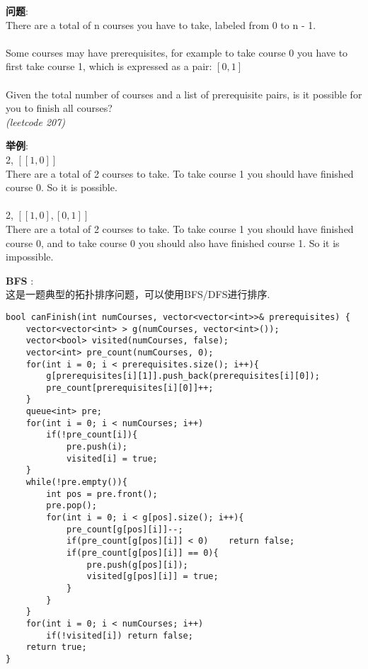     
\begin{description}
    \item{\textbf{问题}}:\\
There are a total of n courses you have to take, labeled from 0 to n - 1.\\
\\
Some courses may have prerequisites, for example to take course 0 you have to first take course 1, which is expressed as a pair: $[0,1]$\\
\\
Given the total number of courses and a list of prerequisite pairs, is it possible for you to finish all courses?\\
\textit{(leetcode 207)}
    \item{\textbf{举例}}:\\
2, $[[1,0]]$ \\
There are a total of 2 courses to take. To take course 1 you should have finished course 0. So it is possible.\\
\\
2, $[[1,0],[0,1]]$ \\
There are a total of 2 courses to take. To take course 1 you should have finished course 0, and to take course 0 you should also have finished course 1. So it is impossible.\\
    \item{\textbf{BFS}} : 
    \\这是一题典型的拓扑排序问题，可以使用BFS/DFS进行排序.
    \begin{lstlisting}
bool canFinish(int numCourses, vector<vector<int>>& prerequisites) {
	vector<vector<int> > g(numCourses, vector<int>());
	vector<bool> visited(numCourses, false);
	vector<int> pre_count(numCourses, 0);
	for(int i = 0; i < prerequisites.size(); i++){
		g[prerequisites[i][1]].push_back(prerequisites[i][0]);
		pre_count[prerequisites[i][0]]++;
	}
	queue<int> pre;
	for(int i = 0; i < numCourses; i++)
		if(!pre_count[i]){
			pre.push(i);
			visited[i] = true;
	}
	while(!pre.empty()){
		int pos = pre.front();
		pre.pop();
		for(int i = 0; i < g[pos].size(); i++){
			pre_count[g[pos][i]]--;
			if(pre_count[g[pos][i]] < 0)	return false;
			if(pre_count[g[pos][i]] == 0){
				pre.push(g[pos][i]);
				visited[g[pos][i]] = true;
			}
		}
	}
	for(int i = 0; i < numCourses; i++)
		if(!visited[i])	return false;
	return true;
}
    \end{lstlisting}
\end{description}
